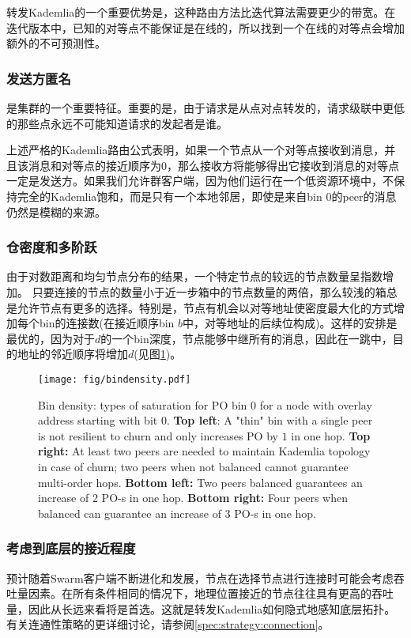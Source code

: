 转发Kademlia的一个重要优势是，这种路由方法比迭代算法需要更少的带宽。在迭代版本中，已知的对等点不能保证是在线的，所以找到一个在线的对等点会增加额外的不可预测性。

\subsubsection{发送方匿名}
是集群的一个重要特征。重要的是，由于请求是从点对点转发的，请求级联中更低的那些点永远不可能知道请求的发起者是谁。 

上述严格的Kademlia路由公式表明，如果一个节点从一个对等点接收到消息，并且该消息和对等点的接近顺序为$0$，那么接收方将能够得出它接收到消息的对等点一定是发送方。如果我们允许群客户端，因为他们运行在一个低资源环境中，不保持完全的Kademlia饱和，而是只有一个本地邻居，即使是来自bin $0$的peer的消息仍然是模糊的来源。 

\subsubsection{仓密度和多阶跃} \label{sec:bindensity}

由于对数距离和均匀节点分布的结果，一个特定节点的较远的节点数量呈指数增加。 
只要连接的节点的数量小于近一步箱中的节点数量的两倍，那么较浅的箱总是允许节点有更多的选择。特别是，节点有机会以对等地址使密度最大化的方式增加每个bin的连接数(在接近顺序bin $b$中，对等地址的后续位构成)。这样的安排是最优的，因为对于$d$的一个bin深度，节点能够中继所有的消息，因此在一跳中，目的地址的邻近顺序将增加$d$(见图\ref{fig:bindensity})。 


\begin{figure}[htbp]
   \centering
   \texttt{[image: fig/bindensity.pdf]}
   \caption[Bin density \statusgreen]{Bin density:  types of saturation for PO bin $0$ for a node with overlay address starting with bit $0$. \textbf{Top left}: A "thin" bin with a single peer is not resilient to churn and only increases PO by $1$ in one hop. \textbf{Top right:} At least two peers are needed to maintain Kademlia topology in case of churn; two peers when not balanced cannot guarantee multi-order hops. \textbf{Bottom left:} Two peers balanced guarantees an increase of 2 PO-s in one hop. \textbf{Bottom right:} Four peers when balanced can guarantee an increase of $3$ PO-s in one hop.}
   \label{fig:bindensity}
\end{figure}

\subsubsection{考虑到底层的接近程度}
预计随着Swarm客户端不断进化和发展，节点在选择节点进行连接时可能会考虑吞吐量因素。在所有条件相同的情况下，地理位置接近的节点往往具有更高的吞吐量，因此从长远来看将是首选。这就是转发Kademlia如何隐式地感知底层拓扑\cite{heep2010r}。有关连通性策略的更详细讨论，请参阅\ref{spec:strategy:connection}。


